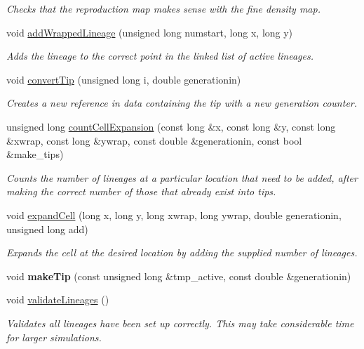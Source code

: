 \begin{DoxyCompactItemize}
\begin{DoxyCompactList}\small\item\em Checks that the reproduction map makes sense with the fine density map. \end{DoxyCompactList}\item 
void \hyperlink{class_tree_acf089cdd22fee4b4621167baa1e17b4e}{add\+Wrapped\+Lineage} (unsigned long numstart, long x, long y)
\begin{DoxyCompactList}\small\item\em Adds the lineage to the correct point in the linked list of active lineages. \end{DoxyCompactList}\item 
void \hyperlink{class_tree_a6af2aaa691ffbb9899e3f070a715e371}{convert\+Tip} (unsigned long i, double generationin)
\begin{DoxyCompactList}\small\item\em Creates a new reference in data containing the tip with a new generation counter. \end{DoxyCompactList}\item 
unsigned long \hyperlink{class_tree_af49dbccf87142a9a2ba932cd7974246e}{count\+Cell\+Expansion} (const long \&x, const long \&y, const long \&xwrap, const long \&ywrap, const double \&generationin, const bool \&make\+\_\+tips)
\begin{DoxyCompactList}\small\item\em Counts the number of lineages at a particular location that need to be added, after making the correct number of those that already exist into tips. \end{DoxyCompactList}\item 
void \hyperlink{class_tree_a1ea4b59664591f312014ba15773176f1}{expand\+Cell} (long x, long y, long xwrap, long ywrap, double generationin, unsigned long add)
\begin{DoxyCompactList}\small\item\em Expands the cell at the desired location by adding the supplied number of lineages. \end{DoxyCompactList}\item 
void {\bfseries make\+Tip} (const unsigned long \&tmp\+\_\+active, const double \&generationin)\hypertarget{class_tree_a1ef4924887d8b9fdf3b45f35187d69d8}{}\label{class_tree_a1ef4924887d8b9fdf3b45f35187d69d8}

\item 
void \hyperlink{class_tree_a4918f354073488d7ace09fd80cd8991c}{validate\+Lineages} ()
\begin{DoxyCompactList}\small\item\em Validates all lineages have been set up correctly. This may take considerable time for larger simulations. \end{DoxyCompactList}\end{DoxyCompactItemize}
